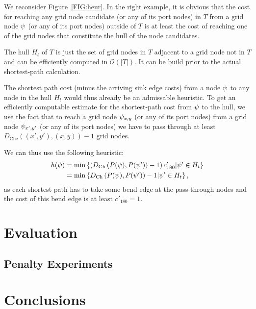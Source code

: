 \documentclass[sigconf]{acmart}
\begin{document}
We reconsider Figure~\ref{FIG:heur}.
In the right example, it is obvious that the cost for reaching any grid node candidate (or any of its port nodes) in $T$ from a grid node $\psi$ (or any of its port nodes) outside of $T$ is at least the cost of reaching one of the grid nodes that constitute the hull of the node candidates.

The hull $H_t$ of $T$ is just the set of grid nodes in $T$ adjacent to a grid node not in $T$ and can be efficiently computed in $\mathcal{O}(|T|)$.
It can be build prior to the actual shortest-path calculation.

The shortest path cost (minus the arriving sink edge costs) from a node $\psi$ to any node in the hull $H_t$ would thus already be an admissable heuristic.
To get an efficiently computable estimate for the shortest-path cost from $\psi$ to the hull, we use the fact that to reach a grid node $\psi_{x, y}$ (or any of its port nodes) from a grid node $\psi_{x', y'}$ (or any of its port nodes) we have to pass through at least $D_{\text{Che}}((x', y'), (x, y)) - 1$ grid nodes.

We can thus use the following heuristic:
%
\begin{align}
	h(\psi) &= \min\left\{ \left(D_{\text{Ch}}\left(P(\psi), P(\psi') \right) - 1\right) c'_{180}| \psi' \in H_t \right\}\\
	&= \min\left\{ D_{\text{Ch}}\left(P(\psi), P(\psi') \right) - 1 | \psi' \in H_t \right\},
\end{align}
%
as each shortest path has to take some bend edge at the pass-through nodes and the cost of this bend edge is at least $c'_{180} = 1$.

\section{Evaluation}

\subsection{Penalty Experiments}

\section{Conclusions}



\end{document}
